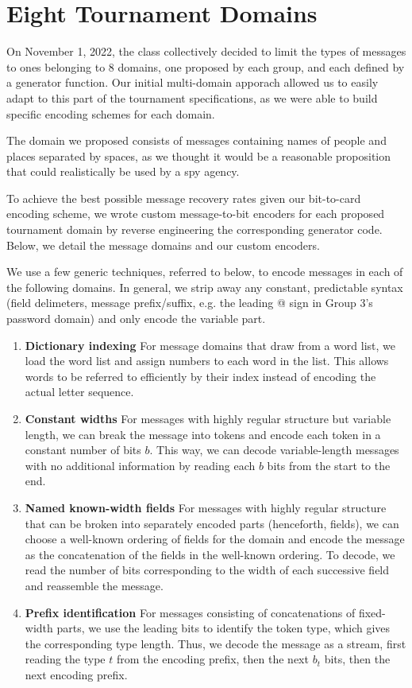 \documentclass[titlepage]{article}
\begin{document}
\section{Eight Tournament Domains} \label{domains}

On November 1, 2022, the class collectively decided to limit the types of messages to ones belonging to 8 domains, one proposed by each group, and each defined by a generator function. Our initial multi-domain apporach allowed us to easily adapt to this part of the tournament specifications, as we were able to build specific encoding schemes for each domain.

The domain we proposed consists of messages containing names of people and places separated by spaces, as we thought it would be a reasonable proposition that could realistically be used by a spy agency.

To achieve the best possible message recovery rates given our bit-to-card encoding scheme, we wrote custom message-to-bit encoders for each proposed tournament domain by reverse engineering the corresponding generator code. Below, we detail the message domains and our custom encoders.

We use a few generic techniques, referred to below, to encode messages in each of the following domains. In general, we strip away any constant, predictable syntax (field delimeters, message prefix/suffix, e.g. the leading @ sign in Group 3's password domain) and only encode the variable part.
\begin{enumerate}
    \item\textbf{Dictionary indexing} For message domains that draw from a word list, we load the word list and assign numbers to each word in the list. This allows words to be referred to efficiently by their index instead of encoding the actual letter sequence.
    \item\textbf{Constant widths} For messages with highly regular structure but variable length, we can break the message into tokens and encode each token in a constant number of bits $b$. This way, we can decode variable-length messages with no additional information by reading each $b$ bits from the start to the end.
    \item\textbf{Named known-width fields} For messages with highly regular structure that can be broken into separately encoded parts (henceforth, fields), we can choose a well-known ordering of fields for the domain and encode the message as the concatenation of the fields in the well-known ordering. To decode, we read the number of bits corresponding to the width of each successive field and reassemble the message.
    \item\textbf{Prefix identification} For messages consisting of concatenations of fixed-width parts, we use the leading bits to identify the token type, which gives the corresponding type length. Thus, we decode the message as a stream, first reading the type $t$ from the encoding prefix, then the next $b_t$ bits, then the next encoding prefix.
\end{enumerate}
\end{document}
